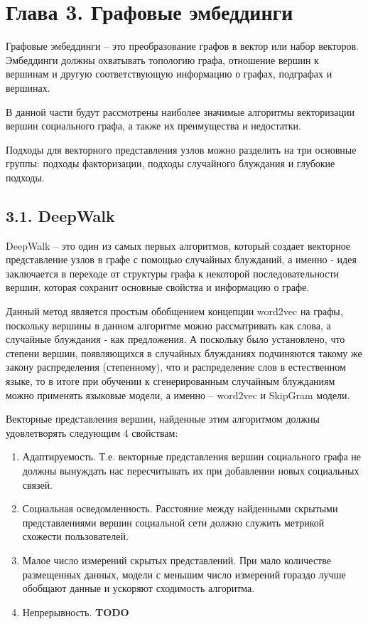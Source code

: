 \section{Глава 3. Графовые эмбеддинги}
Графовые эмбеддинги -- это преобразование графов в вектор или набор векторов. Эмбеддинги должны охватывать топологию графа, отношение вершин к вершинам и другую соответствующую информацию о графах, подграфах и вершинах.

В данной части будут рассмотрены наиболее значимые алгоритмы векторизации вершин социального графа, а также их преимущества и недостатки.

Подходы для векторного представления узлов можно разделить на три основные группы: подходы факторизации, подходы случайного блуждания и глубокие подходы.

\subsection{3.1. DeepWalk}

DeepWalk \cite{DeepWalk} -- это один из самых первых алгоритмов, который создает векторное представление узлов в графе с помощью случайных блужданий, а именно - идея заключается в переходе от структуры графа к некоторой последовательности вершин, которая сохранит основные свойства и информацию о графе. 

Данный метод является простым обобщением концепции word2vec \cite{word2vec} на графы, поскольку вершины в данном алгоритме можно рассматривать как слова, а случайные блуждания - как предложения. А поскольку было установлено, что степени вершин, появляющихся в случайных блужданиях подчиняются такому же закону распределения (степенному), что и распределение слов в естественном языке, то в итоге при обучении к сгенерированным случайным блужданиям можно применять языковые модели, а именно -- word2vec и SkipGram модели.  

Векторные представления вершин, найденные этим алгоритмом должны удовлетворять следующим 4 свойствам:

\begin{enumerate}
\item Адаптируемость. Т.е. векторные представления вершин социального графа не должны вынуждать нас пересчитывать их при добавлении новых социальных связей.
\item Социальная осведомленность. Расстояние между найденными скрытыми представлениями вершин социальной сети должно служить метрикой схожести пользователей.
\item Малое число измерений скрытых представлений. При мало количестве размещенных данных, модели с меньшим число измерений гораздо лучше обобщают данные и ускоряют сходимость алгоритма.
\item Непрерывность. \textbf{TODO}
\end{enumerate}

